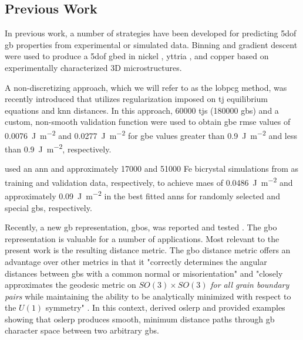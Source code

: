 \documentclass[final,twocolumn,12pt]{elsarticle}
\begin{document}
\subsection{Previous Work}
In previous work, a number of strategies have been developed for predicting \gls{5dof} \gls{gb} properties from experimental or simulated data. Binning and gradient descent were used to produce a \gls{5dof} \gls{gbed} in nickel \cite{liRelativeGrainBoundary2009}, yttria \cite{dillonCharacterizationGrainboundaryCharacter2009}, and copper \cite{randleFiveparameterGrainBoundary2008} based on experimentally characterized 3D microstructures. 

A non-discretizing approach, which we will refer to as the \gls{lobpcg} method, was recently introduced \cite{shenDeterminingGrainBoundary2019} that utilizes regularization imposed on \gls{tj} equilibrium equations and \gls{knn} distances. In this approach, \num{60000} \glspl{tj} (\num{180000} \glspl{gb}) and a custom, non-smooth validation function were used to obtain \gls{gbe} \gls{rmse} values of \SI{0.0076}{\J\per\square\meter} and \SI{0.0277}{\J\per\square\meter} for \gls{gbe} values greater than \SI{0.9}{\J\per\square\meter} and less than \SI{0.9}{\J\per\square\meter}, respectively. 

\citet{restrepoUsingArtificialNeural2014} used an \gls{ann} and approximately \num{17000} and \num{51000} Fe bicrystal simulations from \citet{kimIdentificationSchemeGrain2011} as training and validation data, respectively, to achieve \glspl{mae} of \SI{0.0486}{\J\per\square\meter} and approximately \SI{0.09}{\J\per\square\meter} in the best fitted \glspl{ann} for randomly selected and special \glspl{gb}, respectively. 

Recently, a new \gls{gb} representation, \glspl{gbo}, was reported \cite{francisGeodesicOctonionMetric2019} and tested \cite{chesserLearningGrainBoundary2020}. The \gls{gbo} representation is valuable for a number of applications. Most relevant to the present work is the resulting distance metric. The \gls{gbo} distance metric offers an advantage over other metrics in that it "correctly determines the angular distances between \glspl{gb} with a common normal or misorientation" and "closely approximates the geodesic metric on $SO(3) \times SO(3)$ \textit{for all grain boundary pairs} while maintaining the ability to be analytically minimized with respect to the $U(1)$ symmetry" \cite{francisGeodesicOctonionMetric2019}. In this context, \citet{francisGeodesicOctonionMetric2019} derived \gls{oslerp} and provided examples showing that \gls{oslerp} produces smooth, minimum distance paths through \gls{gb} character space between two arbitrary \glspl{gb}. 
\end{document}

